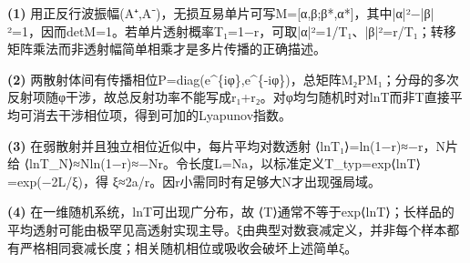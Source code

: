 \par\noindent\textbf{(1)} 用正反行波振幅(A⁺,A⁻)，无损互易单片可写M=[α,β;β*,α*]，其中|α|²−|β|²=1，因而detM=1。若单片透射概率T₁=1−r，可取|α|²=1/T₁、|β|²=r/T₁；转移矩阵乘法而非透射幅简单相乘才是多片传播的正确描述。
\par\noindent\textbf{(2)} 两散射体间有传播相位P=diag(e\textasciicircum{}\{iφ\},e\textasciicircum{}\{-iφ\})，总矩阵M₂PM₁；分母的多次反射项随φ干涉，故总反射功率不能写成r₁+r₂。对φ均匀随机时对lnT而非T直接平均可消去干涉相位项，得到可加的Lyapunov指数。
\par\noindent\textbf{(3)} 在弱散射并且独立相位近似中，每片平均对数透射 ⟨lnT₁⟩=ln(1−r)≈−r，N片给 ⟨lnT\_N⟩≈Nln(1−r)≈−Nr。令长度L=Na，以标准定义T\_typ=exp⟨lnT⟩=exp(−2L/ξ)，得 ξ≈2a/r。因r小需同时有足够大N才出现强局域。
\par\noindent\textbf{(4)} 在一维随机系统，lnT可出现广分布，故 ⟨T⟩通常不等于exp⟨lnT⟩；长样品的平均透射可能由极罕见高透射实现主导。ξ由典型对数衰减定义，并非每个样本都有严格相同衰减长度；相关随机相位或吸收会破坏上述简单ξ。
